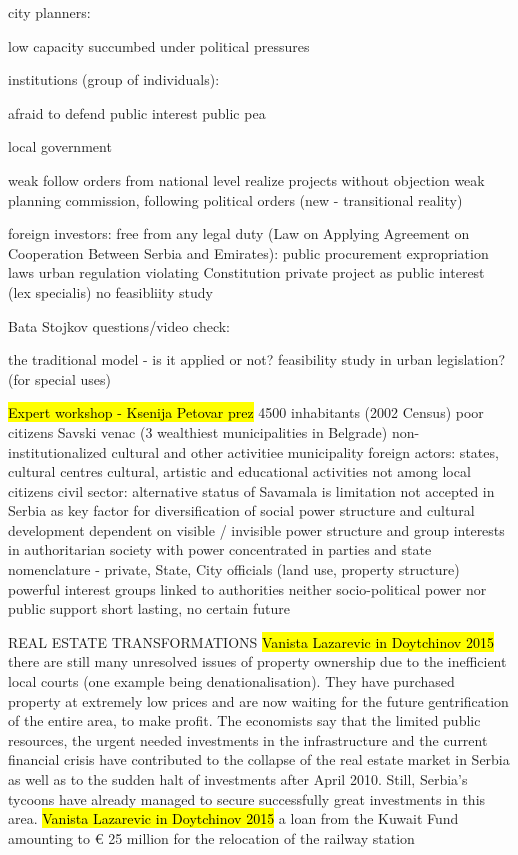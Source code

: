 \documentclass[11pt]{report}
\begin{document}
    city planners:

    low capacity
    succumbed under political pressures

institutions (group of individuals):

    afraid to defend public interest
    public pea

    local government

    weak
    follow orders from national level
    realize projects without objection
    weak planning commission, following political orders (new - transitional reality)

foreign  investors:
    free from any legal duty (Law on Applying Agreement on Cooperation Between Serbia and Emirates):
        public procurement
        expropriation
        laws
        urban regulation
    violating Constitution
    private project as public interest (lex specialis)
    no feasibliity study

Bata Stojkov questions/video check:

    the traditional model - is it applied or not?
    feasibility study in urban legislation? (for special uses)
    
\hl{Expert workshop - Ksenija Petovar prez}
4500 inhabitants (2002 Census)
poor citizens
Savski venac (3 wealthiest municipalities in Belgrade)
non-institutionalized cultural and other activitiee 
    municipality
    foreign actors: states, cultural centres
    cultural, artistic and educational activities
    not among local citizens
civil sector:
    alternative status of Savamala is limitation
    not accepted in Serbia  as key factor for diversification of social power structure and cultural development
    dependent on visible / invisible power structure and group interests in authoritarian society with power concentrated in parties and state nomenclature - private, State, City officials (land use, property structure)
    powerful interest groups linked to authorities
    neither socio-political power nor public support
    short lasting, no certain future
    
REAL ESTATE TRANSFORMATIONS
\hl{Vanista Lazarevic in Doytchinov 2015}
there are still many unresolved issues of property ownership due to  the  inefficient  local  courts  (one  example  being denationalisation).  They  have purchased property at extremely low prices and are now waiting for the future gentrification of the entire area, to make profit. The economists say that the limited public resources, the urgent needed investments in the infrastructure and  the  current  financial  crisis  have  contributed  to  the  collapse  of  the  real estate market in Serbia as well as to the sudden halt of investments after April 2010. Still, Serbia’s tycoons have already managed to secure successfully great investments in this area.
\hl{Vanista Lazarevic in Doytchinov 2015}
a loan from the Kuwait Fund amounting to € 25 million for the relocation of the railway station
\end{document}

